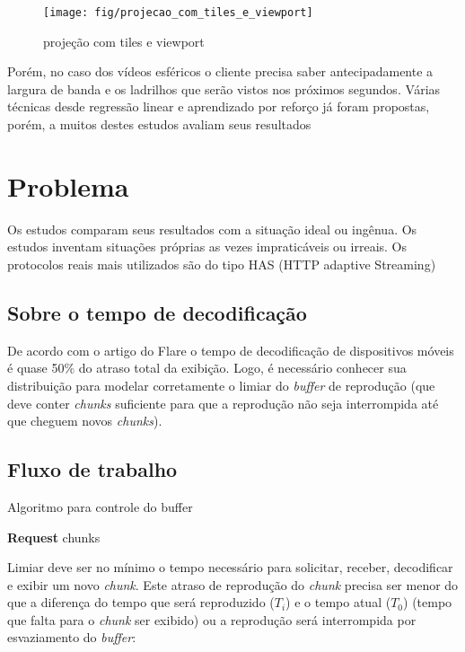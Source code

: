 \begin{figure}[tbh]
	\centering
	\texttt{[image: fig/projecao\_com\_tiles\_e\_viewport]}
	\caption{projeção com tiles e viewport}
	\label{fig:projecaocomtileseviewport}
\end{figure}

Porém, no caso dos vídeos esféricos o cliente precisa saber antecipadamente a largura de banda e os ladrilhos que serão vistos nos próximos segundos. Várias técnicas desde regressão linear e aprendizado por reforço já foram propostas, porém, a muitos destes estudos avaliam seus resultados

\section{Problema}

Os estudos comparam seus resultados com a situação ideal ou ingênua. Os estudos inventam situações próprias as vezes impraticáveis ou irreais. Os protocolos reais mais utilizados são do tipo HAS (HTTP adaptive Streaming)

\subsection{Sobre o tempo de decodificação}

De acordo com o artigo do Flare o tempo de decodificação de dispositivos móveis é quase 50\% do atraso total da exibição. Logo, é necessário conhecer sua distribuição para modelar corretamente o limiar do \textit{buffer} de reprodução (que deve conter \textit{chunks} suficiente para que a reprodução não seja interrompida até que cheguem novos \textit{chunks}).

\subsection{Fluxo de trabalho}

\begin{algorithm}
	\caption{Algoritmo para controle do buffer}\label{alg:buffer_control}
	\begin{algorithmic}[1]

				\State \textbf{Request} chunks
			\EndWhile
		\EndIf
	\EndWhile
	\end{algorithmic}
\end{algorithm}

Limiar deve ser no mínimo o tempo necessário para solicitar, receber, decodificar e exibir um novo \textit{chunk}. Este atraso de reprodução do \textit{chunk} precisa ser menor do que a diferença do tempo que será reproduzido ($T_i$) e o tempo atual ($T_0$) (tempo que falta para o \textit{chunk} ser exibido) ou a reprodução será interrompida por esvaziamento do \textit{buffer}:

